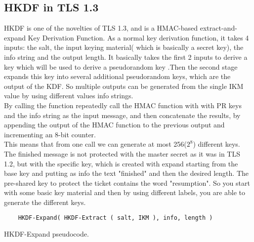 \subsection{HKDF in TLS 1.3}
HKDF is one of the novelties of TLS 1.3, and is a HMAC-based
extract-and-expand Key Derivation Function. As a normal key derivation
function, it takes 4 inputs: the salt, the input keying material(
which is basically a secret key), the info string and the output
length. It basically takes the first 2 inputs to derive a key which
will be used to derive a pseudorandom key .Then the second stage
expands this key into several additional pseudorandom keys, which are
the output of the KDF. So multiple outputs can be generated from the
single IKM value by using different values info strings.\\
By calling the function repeatedly call the HMAC function with with PR
keys and the info string as the input message, and then concatenate 
the results, by appending the output of the HMAC function to the 
previous output and incrementing an 8-bit counter.\\
This means that from one call we can generate at most 256($2^8$)
different keys.\\
The finished message is not protected with the master secret as it was
in TLS 1.2, but with the specific key, which is created with expand
starting from the base key and putting as info the text "finished" and
then the desired length. The pre-shared key to protect the ticket
contains the word "resumption". So you start with some basic key
material and then by using different labels, you are able to generate
the different keys.

\begin{listing}[H]
  \begin{verbatim}
    HKDF-Expand( HKDF-Extract ( salt, IKM ), info, length )
  \end{verbatim}
  \caption{HKDF-Expand pseudocode.}
  \label{lst:hkdf-expand}
\end{listing}

